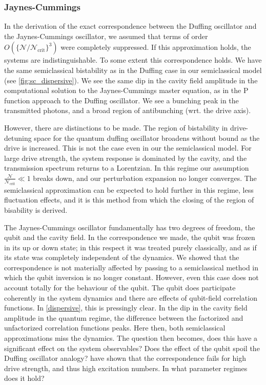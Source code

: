 \subsubsection{Jaynes-Cummings}
In the derivation of the exact correspondence between the Duffing oscillator and the Jaynes-Cummings oscillator, we assumed that terms of order $O(\{\mathscr{N}/\mathscr{N}_\text{crit}\}^3)$ were completely suppressed. 
If this approximation holds, the systems are indistinguishable. 
To some extent this correspondence holds. 
We have the same semiclassical bistability as in the Duffing case in our semiclassical model (see \cref{fig:sc_dispersive}).
We see the same dip in the cavity field amplitude in the computational solution to the Jaynes-Cummings master equation, as in the P function approach to the Duffing oscillator. 
We see a bunching peak in the transmitted photons, and a broad region of antibunching (wrt. the drive axis). 

However, there are distinctions to be made.
The region of bistability in drive-detuning space for the quantum duffing oscillator broadens without bound as the drive is increased. 
This is not the case even in our the semiclassical model. 
For large drive strength, the system response is dominated by the cavity, and the transmission spectrum returns to a Lorentzian.  
In this regime our assumption $\frac{\mathscr{N}}{\mathscr{N}_\text{crit}} \ll 1$ breaks down, and our perturbation expansion no longer converges. 
The semiclassical approximation can be expected to hold further in this regime\cite{Bishop2010}, less fluctuation effects, and it is this method from which the closing of the region of bisability is derived. 

The Jaynes-Cummings oscillator fundamentally has two degrees of freedom, the qubit and the cavity field. 
In the correspondence we made, the qubit was frozen in its up or down state; in this respect it was treated purely classically, and as if its state was completely independent of the dynamics. 
We showed that the correspondence is not materially affected by passing to a semiclassical method in which the qubit inversion is no longer constant.
However, even this case does not account totally for the behaviour of the qubit.
The qubit does participate coherently in the system dynamics and there are effects of qubit-field correlation functions.
In \cref{dispersive}, this is pressingly clear. 
In the dip in the cavity field amplitude in the quantum regime, the difference between the factorized and unfactorized correlation functions peaks.
Here then, both semiclassical approximations miss the dynamics.
The question then becomes, does this have a significant effect on the system observables? 
Does the effect of the qubit spoil the Duffing oscillator analogy?
\cite{Bishop2010} have shown that the correspondence fails for high drive strength, and thus high excitation numbers. 
In what parameter regimes does it hold?
